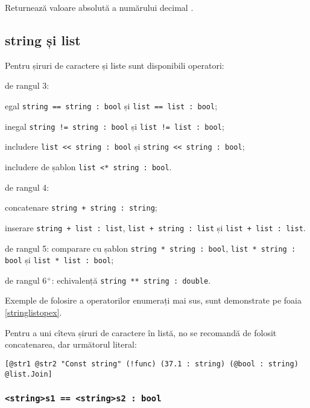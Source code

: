Returnează valoare absolută a numărului decimal .

\subsection{{\color{lightblue}string} și {\color{lightblue}list}}

Pentru șiruri de caractere și liste sunt disponibili operatori:
\begin{icItems}
	\item
		de rangul 3:
		\begin{icItems}
		\item
			egal \lstinline|string == string : bool| și \lstinline|list == list : bool|;
		\item
			inegal \lstinline|string != string : bool| și \lstinline|list != list : bool|;
		\item
			includere \lstinline|list << string : bool| și \lstinline|string << string : bool|;
		\item
			includere de șablon \lstinline|list <* string : bool|.
		\end{icItems}
	\item
		de rangul 4:
		\begin{icItems}
		\item
			concatenare \lstinline|string + string : string|;
		\item
			inserare \lstinline|string + list : list|, \lstinline|list + string : list| și \lstinline|list + list : list|.
		\end{icItems}
	\item
		de rangul 5: comparare cu șablon \lstinline|string * string : bool|, \lstinline|list * string : bool| și \lstinline|list * list : bool|;
	\item
		de rangul 6$^+$: echivalență \lstinline|string ** string : double|.
\end{icItems}

Exemple de folosire a operatorilor enumerați mai sus, sunt demonstrate pe foaia \ref{stringlistopex}.

Pentru a uni cîteva șiruri de caractere în listă, no se recomandă de folosit concatenarea, dar următorul literal:
\begin{lstlisting}[numbers=none]
[@str1 @str2 "Const string" (!func) (37.1 : string) (@bool : string) @list.Join]
\end{lstlisting}

\subsubsection{\lstinline|<string>s1 == <string>s2 : bool|}

